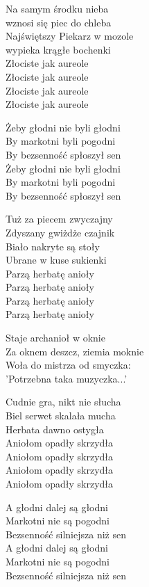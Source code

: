 \begin{text}
    Na samym środku nieba\\
    wznosi się piec do chleba\\
    Najświętszy Piekarz w mozole\\
    wypieka krągłe bochenki\\
    Złociste jak aureole\\
    Złociste jak aureole\\
    Złociste jak aureole\\
    Złociste jak aureole

    \vin Żeby głodni nie byli głodni\\
    \vin By markotni byli pogodni\\
    \vin By bezsenność spłoszył sen\\
    \vin Żeby głodni nie byli głodni\\
    \vin By markotni byli pogodni\\
    \vin By bezsenność spłoszył sen

    \hfill\break
    Tuż za piecem zwyczajny\\
    Zdyszany gwiżdże czajnik\\
    Biało nakryte są stoły\\
    Ubrane w kuse sukienki\\
    Parzą herbatę anioły\\
    Parzą herbatę anioły\\
    Parzą herbatę anioły\\
    Parzą herbatę anioły

    Staje archanioł w oknie\\
    Za oknem deszcz, ziemia moknie\\
    Woła do mistrza od smyczka:\\
    'Potrzebna taka muzyczka...'

    Cudnie gra, nikt nie słucha\\
    Biel serwet skalała mucha\\
    Herbata dawno ostygła\\
    Aniołom opadły skrzydła\\
    Aniołom opadły skrzydła\\
    Aniołom opadły skrzydła\\
    Aniołom opadły skrzydła

    A głodni dalej są głodni\\
    Markotni nie są pogodni\\
    Bezsenność silniejsza niż sen\\
    A głodni dalej są głodni\\
    Markotni nie są pogodni\\
    Bezsenność silniejsza niż sen
\end{text}
